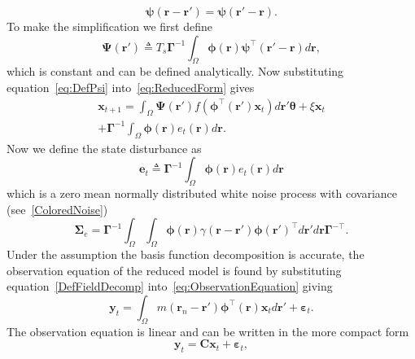 \documentclass[10pt,a4paper]{article}
\begin{document}
\begin{equation}
	\boldsymbol{\psi} (\mathbf{r}-\mathbf{r}') = \boldsymbol{\psi} (\mathbf{r}'-\mathbf{r}).
\end{equation}
To make the simplification we first define
\begin{equation}\label{eq:DefPsi}
	\boldsymbol{\Psi}(\mathbf{r}') \triangleq T_s\boldsymbol{\Gamma}^{-1}\int_\Omega {\boldsymbol{\phi}(\mathbf{r})\boldsymbol{\psi}^{\top} (\mathbf{r}'-\mathbf{r})d\mathbf{r}},
\end{equation}
which is constant and can be defined analytically. Now substituting equation~\ref{eq:DefPsi} into~\ref{eq:ReducedForm} gives
\begin{eqnarray}
	\mathbf{x}_{t+1} = \int_\Omega \boldsymbol{\Psi}(\mathbf{r}') f(\boldsymbol{\phi}^{\top}(\mathbf{r}')\mathbf{x}_t) d\mathbf{r}' \boldsymbol{\theta} + \xi\mathbf{x}_t\nonumber \\
+ \boldsymbol{\Gamma}^{-1} \int_\Omega{\boldsymbol{\phi}(\mathbf{r})e_t(\mathbf{r})d\mathbf{r}}.
\end{eqnarray}
Now we define the state disturbance as
\begin{equation}\label{eq:AppendixWt} 
	\mathbf{e}_t \triangleq \boldsymbol{\Gamma}^{-1}\int_\Omega {\boldsymbol{\phi} ( \mathbf{r} )e_t( \mathbf{r} )d\mathbf{r}} 
\end{equation}
which is a zero mean normally distributed white noise process with covariance (see~\ref{ColoredNoise})
\begin{equation}
	\boldsymbol\Sigma_e =\mathbf{\Gamma}^{-1}\int_{\Omega}\int_{\Omega}\boldsymbol{\phi}\left(\mathbf r\right) \gamma\left(\mathbf r- \mathbf r' \right)\boldsymbol{\phi}\left(\mathbf r'\right)^{\top}d\mathbf r' d\mathbf r\mathbf{\Gamma}^{- \top}. 
\end{equation}
Under the assumption the basis function decomposition is accurate, the observation equation of the reduced model is found by substituting equation~\ref{DefFieldDecomp} into~\ref{eq:ObservationEquation} giving
\begin{equation}\label{eq:ReducedObservationEquation}
	\mathbf{y}_t = \int_{\Omega}{m\left(\mathbf{r}_n-\mathbf{r}'\right)\boldsymbol{\phi}^{\top}\left(\mathbf{r}\right) \mathbf{x}_td\mathbf{r}'} + \boldsymbol{\varepsilon}_t. 
\end{equation}
The observation equation is linear and can be written in the more compact form
\begin{equation}\label{ObservationEquation} 
	\mathbf{y}_t = \mathbf{C}\mathbf{x}_t + \boldsymbol{\varepsilon}_t,
\end{equation}
\end{document}
